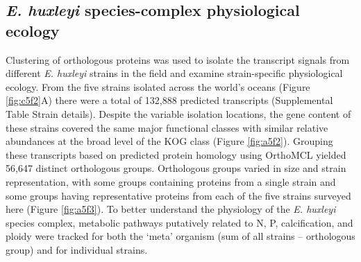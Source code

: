 \begin{figure}[h!]
\end{figure}



\subsection{\textit{E. huxleyi} species-complex physiological ecology}

Clustering of orthologous proteins was used to isolate the transcript signals from different \textit{E. huxleyi} strains in the field and examine strain-specific physiological ecology. From the five strains isolated across the world's oceans (Figure \ref{fig:c5f2}A) there were a total of 132,888 predicted transcripts (Supplemental Table Strain details). Despite the variable isolation locations, the gene content of these strains covered the same major functional classes with similar relative abundances at the broad level of the KOG class (Figure \ref{fig:a5f2}). Grouping these transcripts based on predicted protein homology using OrthoMCL \citep{Li2003} yielded 56,647 distinct orthologous groups. Orthologous groups varied in size and strain representation, with some groups containing proteins from a single strain and some groups having representative proteins from each of the five strains surveyed here (Figure \ref{fig:a5f3}). To better understand the physiology of the \textit{E. huxleyi} species complex, metabolic pathways putatively related to N, P, calcification, and ploidy were tracked for both the `meta' organism (sum of all strains -- orthologous group) and for individual strains. \par

